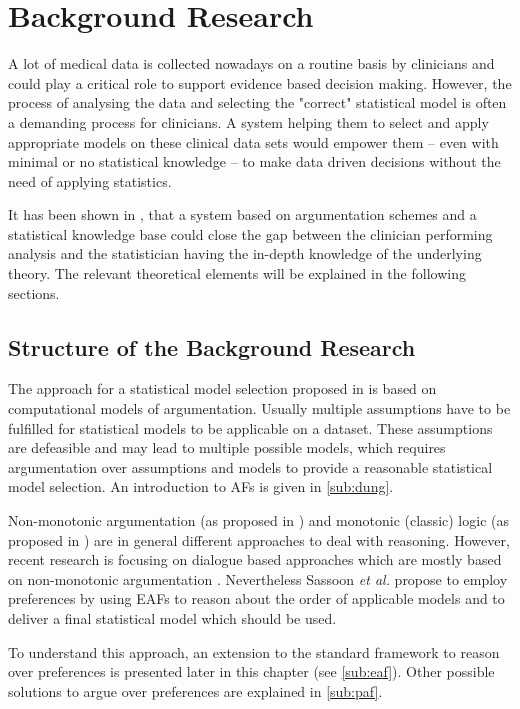 \section{Background Research}
\label{sec:background}

A lot of medical data is collected nowadays on a routine basis by clinicians and could play a critical role to support evidence based decision making. However, the process of analysing the data and selecting the "correct" statistical model is often a demanding process for clinicians. A system helping them to select and apply appropriate models on these clinical data sets would empower them -- even with minimal or no statistical knowledge -- to make data driven decisions without the need of applying statistics. 

It has been shown in \cite{sassoon2014}, that a system based on argumentation schemes and a statistical knowledge base could close the gap between the clinician performing analysis and the statistician having the in-depth knowledge of the underlying theory. The relevant theoretical elements will be explained in the following sections.


\subsection{Structure of the Background Research}

The approach for a statistical model selection proposed in \cite{sassoon2014} is based on computational models of argumentation. Usually multiple assumptions have to be fulfilled for statistical models to be applicable on a dataset. These assumptions are defeasible and may lead to multiple possible models, which requires argumentation over assumptions and models to provide a reasonable statistical model selection. An introduction to \glspl{AF} is given in \autoref{sub:dung}. 

Non-monotonic argumentation (as proposed in \cite{liao,dung1995}) and monotonic (classic) logic (as proposed in \cite{Reiter1980}) are in general different approaches to deal with reasoning. However, recent research is focusing on dialogue based approaches which are mostly based on non-monotonic argumentation \cite{parsons2000,Walton1995}. 
Nevertheless Sassoon \textit{et al.} propose to employ preferences by using \glspl{EAF} to reason about the order of applicable models and to deliver a final statistical model which should be used. 

To understand this approach, an extension to the standard framework to reason over preferences is presented later in this chapter (see \autoref{sub:eaf}). Other possible solutions to argue over preferences are explained in \autoref{sub:paf}.

